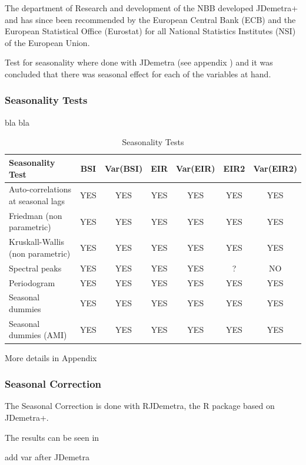 \documentclass[12pt,a4paper,oneside]{book}
\begin{document}
The department of Research and development of the NBB developed JDemetra+ and has since been recommended by the European Central Bank (ECB) and the European Statistical Office (Eurostat) for all National Statistics Institutes (NSI) of the European Union. 


Test for seasonality where done with JDemetra (see appendix ) and it was concluded that there was seasonal effect for each of the variables at hand.

\subsubsection{Seasonality Tests}

bla bla

\begin{table}[H]
    \centering
    \begin{tabular}{l|c|c|c|c|c|c}
\textbf{Seasonality Test} & BSI & Var(BSI) & EIR & Var(EIR) & EIR2 & Var(EIR2) \\ \hline
Auto-correlations at seasonal lags& YES & YES & YES & YES & YES & YES \\
Friedman (non parametric)       & YES   & YES & YES & YES & YES & YES \\
Kruskall-Wallis (non parametric)& YES   & YES & YES & YES & YES & YES \\
Spectral peaks                  & YES   & YES & YES & YES & ?   & NO \\
Periodogram                     & YES   & YES & YES & YES & YES & YES \\
Seasonal dummies                & YES   & YES & YES & YES & YES & YES \\
Seasonal dummies (AMI)          & YES   & YES & YES & YES & YES & YES \\
    \end{tabular}
    \caption{Seasonality Tests}
    \label{tab:Seasonality Tests}
\end{table}{}

More details in Appendix

\subsubsection{Seasonal Correction}

The Seasonal Correction is done with RJDemetra, the R package based on JDemetra+. 

The results can be seen in 

add var after JDemetra
\end{document}
